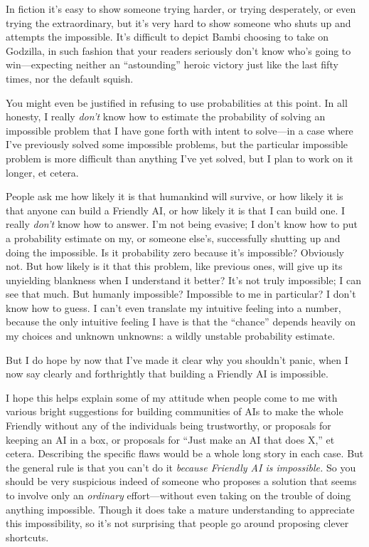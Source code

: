{
 In fiction it's easy to show someone trying
harder, or trying desperately, or even trying the extraordinary, but
it's very hard to show someone who shuts up and
attempts the impossible. It's difficult to depict Bambi
choosing to take on Godzilla, in such fashion that your readers
seriously don't know who's going to
win---expecting neither an
``astounding'' heroic victory just
like the last fifty times, nor the default squish.}

{
 You might even be justified in refusing to use probabilities at
this point. In all honesty, I really \textit{don't}
know how to estimate the probability of solving an impossible problem
that I have gone forth with intent to solve---in a case where
I've previously solved some impossible problems, but
the particular impossible problem is more difficult than anything
I've yet solved, but I plan to work on it longer, et
cetera.}

{
 People ask me how likely it is that humankind will survive, or how
likely it is that anyone can build a Friendly AI, or how likely it is
that I can build one. I really \textit{don't} know how
to answer. I'm not being evasive; I
don't know how to put a probability estimate on my, or
someone else's, successfully shutting up and doing the
impossible. Is it probability zero because it's
impossible? Obviously not. But how likely is it that this problem, like
previous ones, will give up its unyielding blankness when I understand
it better? It's not truly impossible; I can see that
much. But humanly impossible? Impossible to me in particular? I
don't know how to guess. I can't even
translate my intuitive feeling into a number, because the only
intuitive feeling I have is that the
``chance'' depends heavily on my
choices and unknown unknowns: a wildly unstable probability estimate.}

{
 But I do hope by now that I've made it clear why
you shouldn't panic, when I now say clearly and
forthrightly that building a Friendly AI is impossible.}

{
 I hope this helps explain some of my attitude when people come to
me with various bright suggestions for building communities of AIs to
make the whole Friendly without any of the individuals being
trustworthy, or proposals for keeping an AI in a box, or proposals for
``Just make an AI that does X,'' et
cetera. Describing the specific flaws would be a whole long story in
each case. But the general rule is that you can't do it
\textit{because Friendly AI is impossible.} So you should be very
suspicious indeed of someone who proposes a solution that seems to
involve only an \textit{ordinary} effort---without even taking on the
trouble of doing anything impossible. Though it does take a mature
understanding to appreciate this impossibility, so it's
not surprising that people go around proposing clever shortcuts.}

